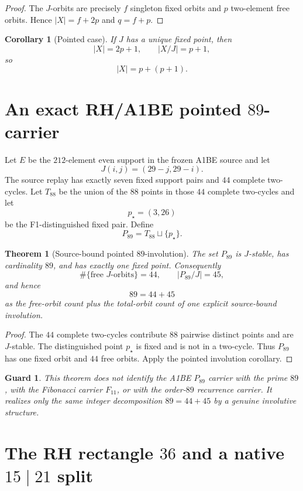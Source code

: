 \documentclass[11pt,a4paper]{article}
\newtheorem{theorem}[definition]{Theorem}
\newtheorem{corollary}[definition]{Corollary}
\newtheorem{guard}[definition]{Guard}
\begin{document}
\begin{proof}
The \(J\)-orbits are precisely \(f\) singleton fixed orbits and \(p\)
two-element free orbits.  Hence \(|X|=f+2p\) and \(q=f+p\).
\end{proof}

\begin{corollary}[Pointed case]
If \(J\) has a unique fixed point, then
\[
|X|=2p+1,\qquad |X/J|=p+1,
\]
so
\[
\boxed{|X|=p+(p+1).}
\]
\end{corollary}

\section{An exact RH/A1BE pointed \(89\)-carrier}

Let \(E\) be the \(212\)-element even support in the frozen A1BE source
and let
\[
J(i,j)=(29-j,29-i).
\]
The source replay has exactly seven fixed support pairs and \(44\)
complete two-cycles.  Let \(T_{88}\) be the union of the \(88\) points
in those \(44\) complete two-cycles and let
\[
p_\star=(3,26)
\]
be the F1-distinguished fixed pair.  Define
\[
P_{89}=T_{88}\sqcup\{p_\star\}.
\]

\begin{theorem}[Source-bound pointed \(89\)-involution]
The set \(P_{89}\) is \(J\)-stable, has cardinality \(89\), and has
exactly one fixed point.  Consequently
\[
\boxed{
\#\{\text{free }J\text{-orbits}\}=44,\qquad
|P_{89}/J|=45,
}
\]
and hence
\[
\boxed{89=44+45}
\]
as the free-orbit count plus the total-orbit count of one explicit
source-bound involution.
\end{theorem}

\begin{proof}
The \(44\) complete two-cycles contribute \(88\) pairwise distinct
points and are \(J\)-stable.  The distinguished point \(p_\star\) is
fixed and is not in a two-cycle.  Thus \(P_{89}\) has one fixed orbit
and \(44\) free orbits.  Apply the pointed involution corollary.
\end{proof}

\begin{guard}
This theorem does not identify the A1BE \(P_{89}\) carrier with the
prime \(89\), with the Fibonacci carrier \(F_{11}\), or with the
order-\(89\) recurrence carrier.  It realizes only the same integer
decomposition \(89=44+45\) by a genuine involutive structure.
\end{guard}

\section{The RH rectangle \(36\) and a native \(15\mid21\) split}
\end{document}

